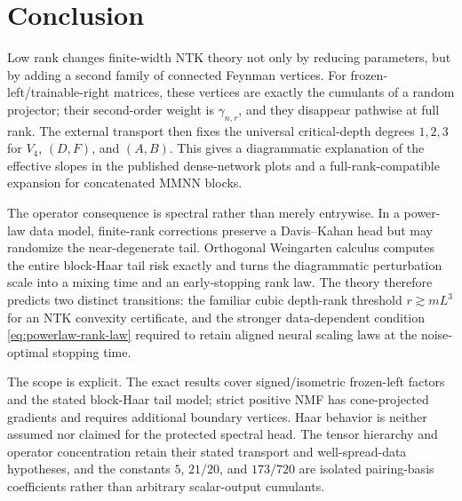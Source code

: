 \documentclass{article}
\begin{document}
\section{Conclusion}
Low rank changes finite-width NTK theory not only by reducing parameters, but by adding a second family of connected Feynman vertices.  For frozen-left/trainable-right matrices, these vertices are exactly the cumulants of a random projector; their second-order weight is \(\gamma_{n,r}\), and they disappear pathwise at full rank.  The external transport then fixes the universal critical-depth degrees \(1,2,3\) for \(V_4\), \((D,F)\), and \((A,B)\).  This gives a diagrammatic explanation of the effective slopes in the published dense-network plots and a full-rank-compatible expansion for concatenated MMNN blocks.

The operator consequence is spectral rather than merely entrywise.  In a power-law data model, finite-rank corrections preserve a Davis--Kahan head but may randomize the near-degenerate tail.  Orthogonal Weingarten calculus computes the entire block-Haar tail risk exactly and turns the diagrammatic perturbation scale into a mixing time and an early-stopping rank law.  The theory therefore predicts two distinct transitions: the familiar cubic depth-rank threshold \(r\gtrsim mL^3\) for an NTK convexity certificate, and the stronger data-dependent condition \eqref{eq:powerlaw-rank-law} required to retain aligned neural scaling laws at the noise-optimal stopping time.

The scope is explicit.  The exact results cover signed/isometric frozen-left factors and the stated block-Haar tail model; strict positive NMF has cone-projected gradients and requires additional boundary vertices.  Haar behavior is neither assumed nor claimed for the protected spectral head.  The tensor hierarchy and operator concentration retain their stated transport and well-spread-data hypotheses, and the constants \(5\), \(21/20\), and \(173/720\) are isolated pairing-basis coefficients rather than arbitrary scalar-output cumulants.
\end{document}
